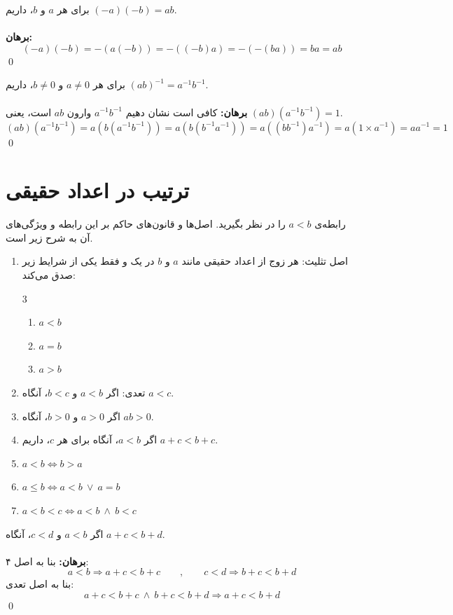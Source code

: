 \begin{theorem}
	برای هر $a$ و $b$، داریم
	$(-a)(-b) = ab$.
	\\ \dfth \\ \textbf{برهان:}
	$$(-a)(-b) = -(a(-b)) = -((-b)a) = -(-(ba)) = ba = ab$$
	\qed
\end{theorem}

\begin{theorem}
	برای هر
	$a \neq 0$ و $b \neq 0$،
	داریم
	$(ab)^{-1}=a^{-1}b^{-1}$.
	\\ \dfth \\ \textbf{برهان:}
	کافی است نشان دهیم
	$a^{-1}b^{-1}$
	وارون
	$ab$
	است، یعنی
	$(ab)(a^{-1}b^{-1})=1$.
	$$(ab)(a^{-1}b^{-1}) = a(b(a^{-1}b^{-1})) = a(b(b^{-1}a^{-1})) = a((bb^{-1})a^{-1}) = a(1 \times a^{-1}) = aa^{-1} = 1$$
	\qed
\end{theorem}

\section{ترتیب در اعداد حقیقی}
رابطه‌ی
$a<b$
را در نظر بگیرید. اصل‌ها و قانون‌های حاکم بر این رابطه و ویژگی‌های آن به شرح زیر است.
\begin{enumerate}
	\item 
	اصل تثلیث: هر زوج از اعداد حقیقی مانند $a$ و $b$ در یک و فقط یکی از شرایط زیر صدق می‌کند:
	\begin{multicols}{3}
		\begin{enumerate}
			\item $a<b$
			\item $a=b$
			\item $a>b$
		\end{enumerate}
	\end{multicols}
	\item 
	تعدی: اگر
	$a<b$ و $b<c$،
	آنگاه
	$a<c$.
	\item 
	اگر
	$a>0$ و $b>0$،
	آنگاه
	$ab>0$.
	\item 
	اگر
	$a<b$،
	آنگاه برای هر $c$، داریم
	$a+c<b+c$.
	\item 
	$a<b \iff b>a$
	\item 
	$a \leq b \iff a<b \ \vee \ a=b$
	\item 
	$a<b<c \iff a<b \ \wedge \ b<c$
\end{enumerate}

\begin{theorem}
	اگر
	$a<b$ و $c<d$،
	آنگاه
	$a+c<b+d$.
	\\ \dfth \\ \textbf{برهان:}
	بنا به اصل ۴:
	$$a<b \Rightarrow a+c<b+c \qquad , \qquad c<d \Rightarrow b+c<b+d$$
	بنا به اصل تعدی:
	$$a+c<b+c \ \wedge \ b+c<b+d \Rightarrow a+c<b+d$$
	\qed
\end{theorem}

